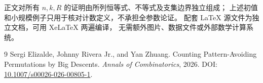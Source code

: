 \documentclass[UTF8,a4paper,11pt,fontset=none]{ctexart}
\numberwithin{equation}{section}
\theoremstyle{paperplain}
\theoremstyle{definition}
\theoremstyle{remark}
\begin{document}
正文对所有 $n,k,R$ 的证明由所列恒等式、不等式及支集边界独立组成；
上述初值和小规模例子只用于核对计数定义，不承担全参数论证。
配套 LaTeX 源文件为独立文档，可用 XeLaTeX 两遍编译，
无需额外图片、数据文件或外部数学计算系统。

\begin{thebibliography}{9}
Sergi Elizalde, Johnny Rivera Jr., and Yan Zhuang.
\newblock Counting Pattern-Avoiding Permutations by Big Descents.
\newblock \emph{Annals of Combinatorics}, 2026.
\newblock DOI: \href{https://doi.org/10.1007/s00026-026-00805-1}{10.1007/s00026-026-00805-1}.
\end{thebibliography}
\end{document}
